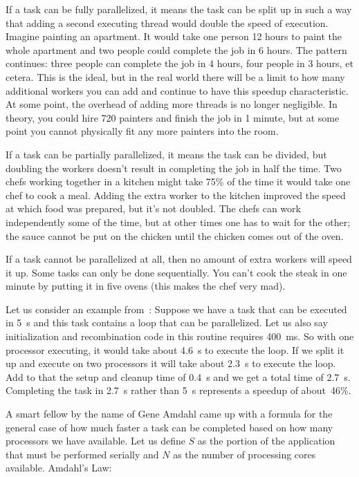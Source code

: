 \documentclass[a4paper]{report}
\begin{document}
If a task can be fully parallelized, it means the task can be split up in such a way that adding a second executing thread would double the speed of execution. Imagine painting an apartment. It would take one person 12 hours to paint the whole apartment and two people could complete the job in 6 hours. The pattern continues: three people can complete the job in 4 hours, four people in 3 hours, et cetera. This is the ideal, but in the real world there will be a limit to how many additional workers you can add and continue to have this speedup characteristic. At some point, the overhead of adding more threads is no longer negligible. In theory, you could hire 720 painters and finish the job in 1 minute, but at some point you cannot physically fit any more painters into the room.

If a task can be partially parallelized, it means the task can be divided, but doubling the workers doesn't result in completing the job in half the time. Two chefs working together in a kitchen might take 75\% of the time it would take one chef to cook a meal. Adding the extra worker to the kitchen improved the speed at which food was prepared, but it's not doubled. The chefs can work independently some of the time, but at other times one has to wait for the other; the sauce cannot be put on the chicken until the chicken comes out of the oven.

If a task cannot be parallelized at all, then no amount of extra workers will speed it up. Some tasks can only be done sequentially. You can't cook the steak in one minute by putting it in five ovens (this makes the chef very mad).

Let us consider an example from~\cite{mte241}: Suppose we have a task that can be executed in 5~s and this task contains a loop that can be parallelized. Let us also say initialization and recombination code in this routine requires 400~ms. So with one processor executing, it would take about 4.6~s to execute the loop. If we split it up and execute on two processors it will take about 2.3~s to execute the loop. Add to that the setup and cleanup time of 0.4~s and we get a total time of 2.7~s. Completing the task in 2.7~s rather than 5~s represents a speedup of about~46\%.

A smart fellow by the name of Gene Amdahl came up with a formula for the general case of how much faster a task can be completed based on how many processors we have available. Let us define $S$ as the portion of the application that must be performed serially and $N$ as the number of processing cores available. Amdahl's Law:
\end{document}
